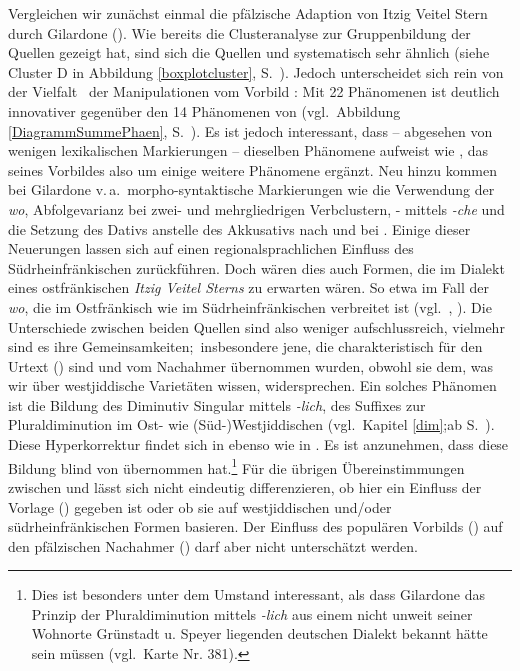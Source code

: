 Vergleichen wir zunächst einmal die pfälzische Adaption von Itzig Veitel Stern durch Gilardone (). Wie bereits die Clusteranalyse zur Gruppenbildung der Quellen  gezeigt hat, sind sich die Quellen  und  systematisch sehr ähnlich  (siehe Cluster D in Abbildung \ref{boxplotcluster}, S.\, \pageref{boxplotcluster}). Jedoch unterscheidet sich  rein von der Vielfalt \,%
 der Manipulationen vom Vorbild : Mit 22 Phänomenen ist  deutlich innovativer gegenüber den 14 Phänomenen von  (vgl.\, Abbildung \ref{DiagrammSummePhaen}, S.\, \pageref{DiagrammSummePhaen}). Es ist jedoch interessant, dass  – abgesehen von wenigen lexikalischen Markierungen – dieselben Phänomene aufweist wie , das \hai{{\LiJi}} seines Vorbildes also um einige weitere Phänomene ergänzt. Neu hinzu kommen bei Gilardone v.\,a.\, morpho-syntaktische Markierungen wie die Verwendung der  \textit{wo}, Abfolgevarianz bei zwei- und mehrgliedrigen Verbclustern, - mittels \textit{-che} und die Setzung des Dativs anstelle des Akkusativs nach  und bei . Einige dieser Neuerungen lassen sich auf einen regionalsprachlichen Einfluss des Südrheinfränkischen zurückführen. Doch wären dies auch Formen, die im Dialekt eines ostfränkischen \textit{Itzig Veitel Sterns} zu erwarten wären. So etwa im Fall der  \textit{wo}, die im Ostfränkisch wie im  Südrheinfränkischen verbreitet ist (vgl.\, \citealt{Fleischer2005b}, \citeyear*{Fleischer2004d}). 
 Die Unterschiede zwischen beiden Quellen sind also weniger aufschlussreich, vielmehr sind es ihre Gemeinsamkeiten;\, insbesondere jene, die charakteristisch für den Urtext () sind und vom Nachahmer übernommen wurden, obwohl sie dem, was wir über westjiddische Varietäten wissen, widersprechen. Ein solches Phänomen ist die Bildung des Diminutiv Singular mittels \textit{-lich}, des Suffixes zur Pluraldiminution im Ost- wie (Süd-)Westjiddischen (vgl.\, Kapitel \ref{dim};ab S.\, \pageref{dim}). Diese Hyperkorrektur findet sich in   ebenso wie in . Es ist anzunehmen, dass   diese Bildung blind von  übernommen hat.\footnote{Dies ist besonders unter dem Umstand interessant, als dass Gilardone das Prinzip der Pluraldiminution mittels \textit{-lich} aus einem nicht unweit seiner Wohnorte Grünstadt u. Speyer liegenden deutschen Dialekt bekannt hätte sein müssen (vgl.\,  Karte Nr. 381).} Für die übrigen Übereinstimmungen zwischen  und   lässt sich nicht eindeutig differenzieren, ob hier ein Einfluss der Vorlage () gegeben ist oder ob sie auf westjiddischen und/oder südrheinfränkischen Formen basieren. Der Einfluss des populären Vorbilds () auf den pfälzischen Nachahmer () darf aber nicht unterschätzt werden. %

